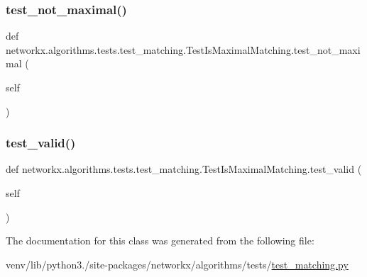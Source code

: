 \subsubsection{\texorpdfstring{test\+\_\+not\+\_\+maximal()}{test\_not\_maximal()}}
{\footnotesize\ttfamily def networkx.\+algorithms.\+tests.\+test\+\_\+matching.\+Test\+Is\+Maximal\+Matching.\+test\+\_\+not\+\_\+maximal (\begin{DoxyParamCaption}\item[{}]{self }\end{DoxyParamCaption})}

\mbox{\label{classnetworkx_1_1algorithms_1_1tests_1_1test__matching_1_1TestIsMaximalMatching_ad11e03db004ccfa45b15c9d6b3d40747}} 
\subsubsection{\texorpdfstring{test\+\_\+valid()}{test\_valid()}}
{\footnotesize\ttfamily def networkx.\+algorithms.\+tests.\+test\+\_\+matching.\+Test\+Is\+Maximal\+Matching.\+test\+\_\+valid (\begin{DoxyParamCaption}\item[{}]{self }\end{DoxyParamCaption})}



The documentation for this class was generated from the following file\+:\begin{DoxyCompactItemize}
\item 
venv/lib/python3./site-\/packages/networkx/algorithms/tests/\hyperlink{tests_2test__matching_8py}{test\+\_\+matching.\+py}\end{DoxyCompactItemize}
